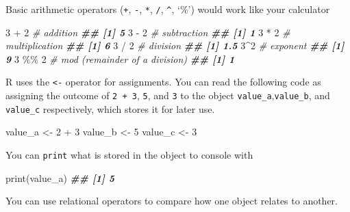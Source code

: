 \documentclass[
]{book}
\newenvironment{Shaded}{\begin{snugshade}}{\end{snugshade}}
\newcommand{\CommentTok}[1]{\textcolor[rgb]{0.56,0.35,0.01}{\textit{#1}}}
\newcommand{\DecValTok}[1]{\textcolor[rgb]{0.00,0.00,0.81}{#1}}
\newcommand{\DocumentationTok}[1]{\textcolor[rgb]{0.56,0.35,0.01}{\textbf{\textit{#1}}}}
\newcommand{\FunctionTok}[1]{\textcolor[rgb]{0.00,0.00,0.00}{#1}}
\newcommand{\NormalTok}[1]{#1}
\newcommand{\OtherTok}[1]{\textcolor[rgb]{0.56,0.35,0.01}{#1}}
\newcommand{\SpecialCharTok}[1]{\textcolor[rgb]{0.00,0.00,0.00}{#1}}
\begin{document}
Basic arithmetic operators (\texttt{+}, \texttt{-}, \texttt{*}, \texttt{/}, \texttt{\^{}}, `\%') would work like your calculator

\begin{Shaded}
\begin{Highlighting}[]
\DecValTok{3} \SpecialCharTok{+} \DecValTok{2} \CommentTok{\# addition}
\DocumentationTok{\#\# [1] 5}
\DecValTok{3} \SpecialCharTok{{-}} \DecValTok{2} \CommentTok{\# subtraction}
\DocumentationTok{\#\# [1] 1}
\DecValTok{3} \SpecialCharTok{*} \DecValTok{2} \CommentTok{\# multiplication}
\DocumentationTok{\#\# [1] 6}
\DecValTok{3} \SpecialCharTok{/} \DecValTok{2} \CommentTok{\# division}
\DocumentationTok{\#\# [1] 1.5}
\DecValTok{3}\SpecialCharTok{\^{}}\DecValTok{2} \CommentTok{\# exponent}
\DocumentationTok{\#\# [1] 9}
\DecValTok{3} \SpecialCharTok{\%\%} \DecValTok{2} \CommentTok{\# mod (remainder of a division)}
\DocumentationTok{\#\# [1] 1}
\end{Highlighting}
\end{Shaded}

R uses the \texttt{\textless{}-} operator for assignments. You can read the following code as assigning the outcome of \texttt{2\ +\ 3}, \texttt{5}, and \texttt{3} to the object \texttt{value\_a},\texttt{value\_b}, and \texttt{value\_c} respectively, which stores it for later use.

\begin{Shaded}
\begin{Highlighting}[]
\NormalTok{value\_a }\OtherTok{\textless{}{-}} \DecValTok{2} \SpecialCharTok{+} \DecValTok{3}
\NormalTok{value\_b }\OtherTok{\textless{}{-}} \DecValTok{5}
\NormalTok{value\_c }\OtherTok{\textless{}{-}} \DecValTok{3}
\end{Highlighting}
\end{Shaded}

You can \texttt{print} what is stored in the object to console with

\begin{Shaded}
\begin{Highlighting}[]
\FunctionTok{print}\NormalTok{(value\_a)}
\DocumentationTok{\#\# [1] 5}
\end{Highlighting}
\end{Shaded}

You can use relational operators to compare how one object relates to another.
\end{document}

